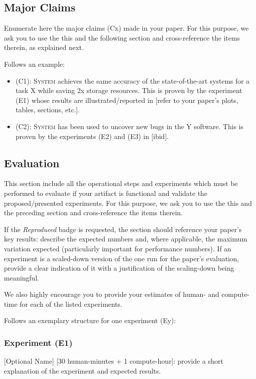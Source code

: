 \documentclass[conference]{IEEEtran}
\begin{document}
\subsection{Major Claims}
Enumerate here the major claims (Cx) made in your paper. For this purpose, we ask you to use the this and the following section and cross-reference the items therein, as explained next.

Follows an example:

\begin{itemize}
    \item (C1): \textsc{System} achieves the same accuracy of the state-of-the-art systems for a task X while saving 2x storage resources. This is proven by the experiment (E1) whose results are illustrated/reported in [refer to your paper's plots, tables, sections, etc.].
    \item (C2): \textsc{System} has been used to uncover new bugs in the Y software. This is proven by the experiments (E2) and (E3) in [ibid].
\end{itemize}

\subsection{Evaluation}

This section include all the operational steps and experiments which must be performed to evaluate if your artifact is functional and validate the proposed/presented experiments. For this purpose, we ask you to use the this and the preceding section and cross-reference the items therein.

If the \textit{Reproduced} badge is requested, the section should reference your paper's key results: describe the expected numbers and, where applicable, the maximum variation expected (particularly important for performance numbers). If an experiment is a scaled-down version of the one run for the paper's evaluation, provide a clear indication of it with a justification of the scaling-down being meaningful.

We also highly encourage you to provide your estimates of human- and compute-time for each of the listed experiments.

Follows an exemplary structure for one experiment (Ey):

\subsubsection{Experiment (E1)}
[Optional Name] [30 human-minutes + 1 compute-hour]: provide a short explanation of the experiment and expected results.
\end{document}
